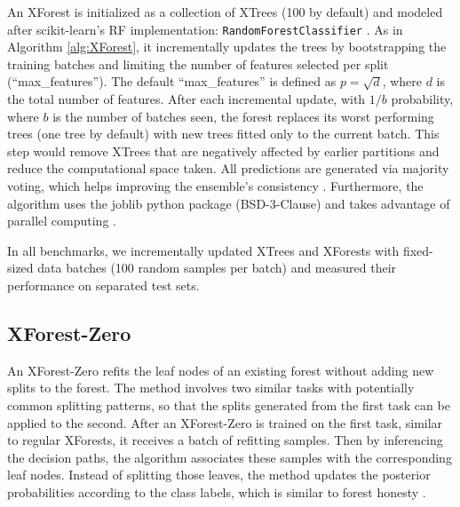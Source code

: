An XForest
is initialized as a collection of XTrees (100 by default) and modeled after scikit-learn's RF implementation: \texttt{RandomForestClassifier} \citep{pedregosa_scikit-learn_2011}. As in Algorithm \ref{alg:XForest}, it incrementally updates the trees by bootstrapping the training batches and limiting the number of features selected per split (``max\_features''). The default ``max\_features'' is defined as $p=\sqrt{d}$, where $d$ is the total number of features. After each incremental update, with $1/b$ probability, where $b$ is the number of batches seen, the forest replaces its worst performing trees (one tree by default) with new trees fitted only to the current batch. 
This step would remove XTrees that are negatively affected by earlier partitions and reduce the computational space taken. All predictions are generated via majority voting, which helps improving the ensemble's consistency \citep{liaw_classification_2002, biau_consistency_2008, breiman_random_2001}. Furthermore, the algorithm uses the joblib python package (BSD-3-Clause) and takes advantage of parallel computing \citep{joblib_developers_joblibjoblib_2022}.

In all benchmarks, we incrementally updated XTrees and XForests with fixed-sized data batches (100 random samples per batch) and measured their performance on separated test sets.

\subsection{XForest-Zero}
An XForest-Zero refits the leaf nodes of an existing forest without adding new splits to the forest. The method involves two similar tasks with potentially common splitting patterns, so that the splits generated from the first task can be applied to the second. After an XForest-Zero is trained on the first task, similar to regular XForests, it receives a batch of refitting samples. Then by inferencing the decision paths, the algorithm associates these samples with the corresponding leaf nodes. Instead of splitting those leaves, the method updates the posterior probabilities according to the class labels, which is similar to forest honesty \citep{athey_generalized_2018}.

